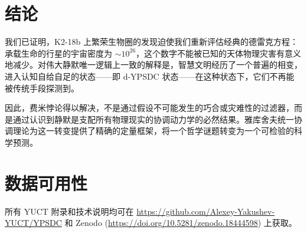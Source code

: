 \documentclass[11pt,a4paper]{article}
\begin{document}
	\section{结论}
	\label{sec:conclusions}
	我们已证明，K2-18b 上繁荣生物圈的发现迫使我们重新评估经典的德雷克方程：承载生命的行星的宇宙密度为 \(\sim 10^{26}\)，这个数字不能被已知的天体物理灾害有意义地减少。对伟大静默唯一逻辑上一致的解释是，智慧文明经历了一个普遍的相变，进入认知自给自足的状态——即 d-YPSDC 状态——在这种状态下，它们不再能被传统手段探测到。
	
	因此，费米悖论得以解决，不是通过假设不可能发生的巧合或灾难性的过滤器，而是通过认识到静默是支配所有物理现实的协调动力学的必然结果。雅库舍夫统一协调理论为这一转变提供了精确的定量框架，将一个哲学谜题转变为一个可检验的科学预测。
	
	\section*{数据可用性}
	所有 YUCT 附录和技术说明均可在 \url{https://github.com/Alexey-Yakushev-YUCT/YPSDC} 和 Zenodo (\url{https://doi.org/10.5281/zenodo.18444598}) 上获取。
	
\end{document}
